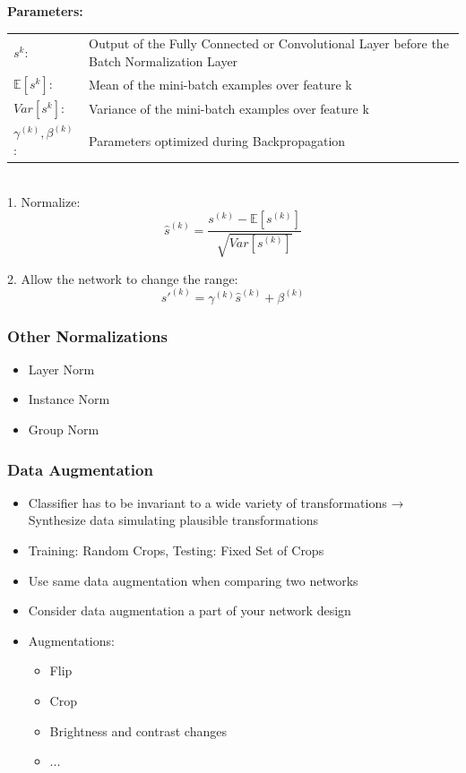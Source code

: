 \documentclass[10pt,a4paper]{article}
\newcommand{\props}{$\circ$}
\newcommand{\iprops}{\item[\props]}
\begin{document}
\textbf{Parameters:} \\
\begin{tabular}{ll}
	$s^k$: & Output of the Fully Connected or Convolutional Layer before the Batch Normalization Layer \\
	$\mathbb{E}[s^k]$: & Mean of the mini-batch examples over feature k \\
 	$Var[s^k]$: & Variance of the mini-batch examples over feature k \\
 	$\gamma^{(k)}, \beta^{(k)}$: & Parameters optimized during Backpropagation
\end{tabular} ~\\

1. Normalize:
$$
	\hat s^{(k)} = \frac{s^{(k)} - \mathbb E[s^{(k)}]}{\sqrt{Var[s^{(k)}]}}
$$

2. Allow the network to change the range:
$$
	s'^{(k)}  = \gamma^{(k)} \hat s^{(k)} + \beta^{(k)}
$$

\subsubsection{Other Normalizations}
\begin{itemize}
	\item Layer Norm
	\item Instance Norm
	\item Group Norm
\end{itemize}



\subsubsection{Data Augmentation}
\begin{itemize}
	\item Classifier has to be invariant to a wide variety of transformations → Synthesize data simulating plausible transformations
	\iprops Training: Random Crops, Testing: Fixed Set of Crops
	\iprops Use same data augmentation when comparing two networks
	\iprops Consider data augmentation a part of your network design
	\item Augmentations:
	\begin{itemize}
		\item Flip
		\item Crop
		\item Brightness and contrast changes
		\item ... 
	\end{itemize}
\end{itemize}
\end{document}
